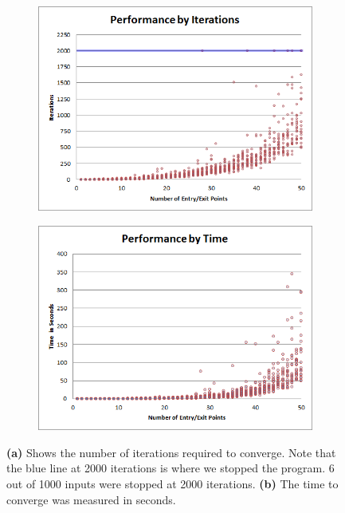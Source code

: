 \begin{figure}[t]
 \centering
%
\begin{subfigure}[b]{0.48\linewidth}
 \centering
	\includegraphics[width=\linewidth]{images/res-iter-graph.png}
	\caption{}
 \end{subfigure}
%
\begin{subfigure}[b]{0.48\linewidth}
 \centering
	\includegraphics[width=\linewidth]{images/res-time-graph.png}
	\caption{}
 \end{subfigure}
% 
\caption{\textbf{(a)} Shows the number of iterations required to converge. Note that the blue line at 2000 iterations is where we stopped the program. 6  out of 1000 inputs were stopped at 2000 iterations. \textbf{(b)} The time to converge was measured in seconds.   }
\label{fig:res:graphs}
\end{figure}
